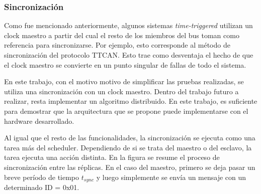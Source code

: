 \subsubsection{Sincronización}


Como fue mencionado anteriormente, algunos sistemas \textit{time-triggered} utilizan un clock maestro a partir del cual el resto de los miembros del bus toman como referencia para sincronizarse. Por ejemplo, esto corresponde al método de sincronización del protocolo TTCAN. Esto trae como desventaja el hecho de que el clock maestro se convierte en un punto singular de fallas de todo el sistema. 

En este trabajo, con el motivo motivo de simplificar las pruebas realizadas, se utiliza una sincronización con un clock maestro. Dentro del trabajo futuro a realizar, resta implementar un algoritmo distribuido. En este trabajo, es suficiente para demostrar que la arquitectura que se propone puede implementarse con el hardware desarrollado.


Al igual que el resto de las funcionalidades, la sincronización se ejecuta como una tarea más del scheduler. Dependiendo de si se trata del maestro o del esclavo, la tarea ejecuta una acción distinta. En la figura  se resume el proceso de sincronización entre las réplicas. En el caso del maestro, primero se deja pasar un breve período de tiempo $t_{sync}$ y luego simplemente se envía un mensaje con un determinado ID = 0x01.

